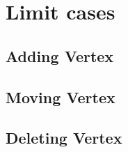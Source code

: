 \documentclass{report}
\begin{document}
\section{Limit cases}
\subsection{Adding Vertex}
    \paragraph*{}
\subsection{Moving Vertex}
    \paragraph*{}
\subsection{Deleting Vertex}
    \paragraph*{}
    \paragraph*{}
\end{document}
